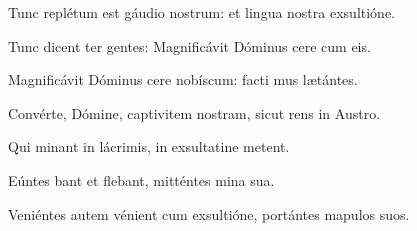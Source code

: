 \item {}

\item Tunc replétum est gáudio  nostrum:\psstar{} et lingua nostra exsultióne.

\item Tunc dicent ter gentes:\psstar{} Magnificávit Dóminus cere cum eis.

\item Magnificávit Dóminus cere nobíscum:\psstar{} facti mus lætántes.

\item Convérte, Dómine, captivitem nostram,\psstar{} sicut rens in Austro.

\item Qui minant in lácrimis,\psstar{} in exsultatine metent.

\item Eúntes bant et flebant,\psstar{} mitténtes mina sua.

\item Veniéntes autem vénient cum exsultióne,\psstar{} portántes mapulos suos.

